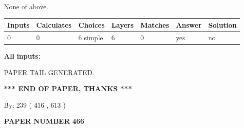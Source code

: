\documentclass[12pt]{article}
\begin{document}
 
 None of above.
 
 
\noindent{}
 
 
   
   
   
   
\noindent\begin{tabular}{|l|l|l|l|l|l|l|}
 \hline
Inputs & Calculates & Choices & Layers & Matches & Answer & Solution \\ \hline
 0  & 
 0  & 
 6
  simple  
  & 
 6  & 
 0  & 
  yes & 
  no 
  \\ \hline
 \end{tabular}
   
   
   
   
\noindent{}
   
   
   
   
\noindent\vspace{0.1in}\hspace{-0.08in} {\textbf{\Large{All inputs: }}}
   
   
   
   
   
   
 \vspace{0.2in}
 
   
   
\vspace{2.0in} PAPER TAIL GENERATED.
   
   
   
   
\vspace{1.0in} 
{\textbf{\large{ *** END OF PAPER, THANKS *** }}} 
   
   
\hspace{1.0in} By: 
 239 ( 416 ,  613 )
   
   
   
   
\newpage 
\setcounter{page}{ 
   466001 } 
   
   
   
   
 {\textbf{ \Large{ PAPER NUMBER  466  }}}
   
   
\vspace{0.2in}
   
   
   
   
   
   
   
\end{document}
